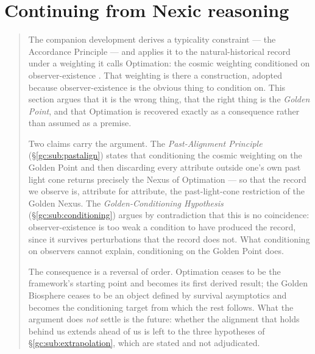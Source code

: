 \documentclass[11pt]{article}
\numberwithin{equation}{section}
\theoremstyle{plain}
\theoremstyle{definition}
\theoremstyle{remark}
\begin{document}

\section{Continuing from Nexic reasoning}\label{gc:sec}

\begin{quote}\small
The companion development derives a typicality constraint --- the
Accordance Principle --- and applies it to the natural-historical record
under a weighting it calls Optimation: the cosmic weighting conditioned
on observer-existence \cite{Nexus, Ben26Found, Ben26Optimal}. That
weighting is there a construction, adopted because observer-existence is
the obvious thing to condition on. This section argues that it is the
wrong thing, that the right thing is the \emph{Golden Point}, and that
Optimation is recovered exactly as a consequence rather than assumed as
a premise.

Two claims carry the argument. The \emph{Past-Alignment Principle}
(\S\ref{gc:sub:pastalign}) states that conditioning the cosmic weighting
on the Golden Point and then discarding every attribute outside one's
own past light cone returns precisely the Nexus of Optimation --- so
that the record we observe is, attribute for attribute, the past-light-cone
restriction of the Golden Nexus. The \emph{Golden-Conditioning
Hypothesis} (\S\ref{gc:sub:conditioning}) argues by contradiction that
this is no coincidence: observer-existence is too weak a condition to
have produced the record, since it survives perturbations that the
record does not. What conditioning on observers cannot explain,
conditioning on the Golden Point does.

The consequence is a reversal of order. Optimation ceases to be the
framework's starting point and becomes its first derived result; the
Golden Biosphere ceases to be an object defined by survival asymptotics
and becomes the conditioning target from which the rest follows. What
the argument does \emph{not} settle is the future: whether the alignment
that holds behind us extends ahead of us is left to the three
hypotheses of \S\ref{gc:sub:extrapolation}, which are stated and not
adjudicated.
\end{quote}
\end{document}
